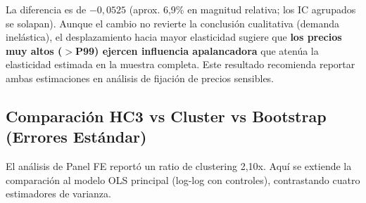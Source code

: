 \documentclass[doc, a4paper, biblatex, floatsintext, longtable, babel]{apa7}
\begin{document}
La diferencia es de \textbf{$-0,0525$} (aprox. 6,9\% en magnitud relativa; los IC agrupados se solapan). Aunque el cambio no revierte la conclusión cualitativa (demanda inelástica), el desplazamiento hacia mayor elasticidad sugiere que \textbf{los precios muy altos ($>$P99) ejercen influencia apalancadora} que atenúa la elasticidad estimada en la muestra completa. Este resultado recomienda reportar ambas estimaciones en análisis de fijación de precios sensibles.

\subsection{Comparación HC3 vs Cluster vs Bootstrap (Errores Estándar)}
\label{subsec:comparacion_ee}

El análisis de Panel FE reportó un ratio de clustering 2,10x. Aquí se extiende la comparación al modelo OLS principal (log-log con controles), contrastando cuatro estimadores de varianza.
\end{document}
